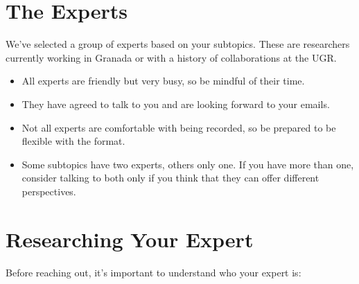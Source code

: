 \documentclass[
  letterpaper,
  DIV=11,
  numbers=noendperiod]{scrreprt}
\providecommand{\tightlist}{%
  \setlength{\itemsep}{0pt}\setlength{\parskip}{0pt}}\usepackage{longtable,booktabs,array}
\begin{document}
\section{The Experts}\label{the-experts}

We've selected a group of experts based on your subtopics. These are
researchers currently working in Granada or with a history of
collaborations at the UGR.

\begin{itemize}
\tightlist
\item
  All experts are friendly but very busy, so be mindful of their time.
\item
  They have agreed to talk to you and are looking forward to your
  emails.
\item
  Not all experts are comfortable with being recorded, so be prepared to
  be flexible with the format.
\item
  Some subtopics have two experts, others only one. If you have more
  than one, consider talking to both only if you think that they can
  offer different perspectives.
\end{itemize}

\section{Researching Your Expert}\label{researching-your-expert}

Before reaching out, it's important to understand who your expert is:
\end{document}
